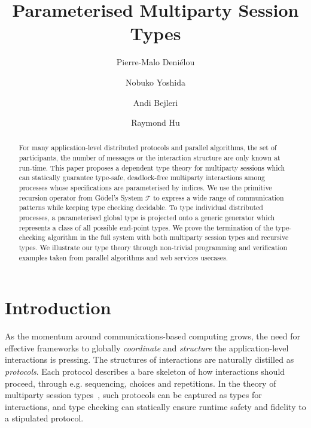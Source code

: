 \documentclass{LMCS}
\title[Parameterised Multiparty Session Types]{Parameterised Multiparty Session Types}
\author[P.-M.~Deni\'elou]{Pierre-Malo Deni\'elou}
\author[N.~Yoshida]{Nobuko Yoshida}
\author[A.~Bejleri]{Andi Bejleri}
\author[R.~Hu]{Raymond Hu}
\begin{document}
\begin{abstract}
\noindent
For many application-level distributed protocols and parallel algorithms, the
set of participants, the number of messages or the interaction structure are
only known at run-time.
This paper proposes a dependent type theory for multiparty sessions which can
statically guarantee type-safe, deadlock-free multiparty interactions among
processes whose specifications are parameterised by indices.
We use the primitive recursion operator from G\"odel's System $\mathcal{T}$ to
express a wide range of communication patterns while keeping type checking
decidable.
To type individual distributed processes, a parameterised global type is
projected onto a generic generator which represents a class of all possible
end-point types.
We prove the termination of the type-checking algorithm in the
full system with both multiparty session types and recursive types.
We illustrate our type theory through non-trivial
programming and verification examples
taken from parallel algorithms and web services usecases.
\end{abstract}




















\maketitle

\section{Introduction}
\label{sec:introduction}
\noindent
As the momentum around communications-based computing grows, the need
for effective frameworks to
globally {\em coordinate} and {\em structure} the application-level
interactions is pressing. The structures of interactions are naturally distilled as
{\em protocols}. Each protocol describes a bare skeleton of how
interactions should proceed, through e.g.
sequencing, choices and repetitions.
In the theory of multiparty session types~\cite{CHY07,BC07,BettiniCDLDY08LONG},
such protocols can be captured as types for interactions,
and type checking can statically ensure runtime safety and fidelity
to a stipulated
protocol.
\end{document}
